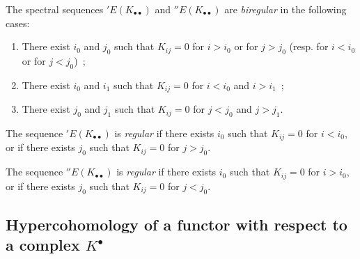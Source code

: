 \begin{env}[11.3.6]
\label{0.11.3.6}
The spectral sequences $'E(K_{\bullet\bullet})$ and
$''E(K_{\bullet\bullet})$ are \emph{biregular} in the following cases:
\begin{enumerate}
  \item[\textit{a)}] There exist $i_0$ and $j_0$ such that $K_{ij}=0$ for $i>i_0$ or
    for $j>j_0$ (resp. for $i<i_0$
    or for $j<j_0$)~;
  \item[\textit{b)}] There exist $i_0$ and $i_1$ such that $K_{ij}=0$ for $i<i_0$ and
    $i>i_1$~;
  \item[\textit{c)}] There exist $j_0$ and $j_1$ such that $K_{ij}=0$ for $j<j_0$ and
    $j>j_1$.
\end{enumerate}

The sequence $'E(K_{\bullet\bullet})$ is \emph{regular} if there exists $i_0$ such that
$K_{ij}=0$ for $i<i_0$, or if there exists $j_0$ such that $K_{ij}=0$ for
$j>j_0$.

The sequence $''E(K_{\bullet\bullet})$ is \emph{regular} if there exists $i_0$ such that
$K_{ij}=0$ for $i>i_0$, or if there exists $j_0$ such that $K_{ij}=0$ for
$j<j_0$.
\end{env}


\subsection{Hypercohomology of a functor with respect to a complex
$K^\bullet$}
\label{subsection:0.11.4}

